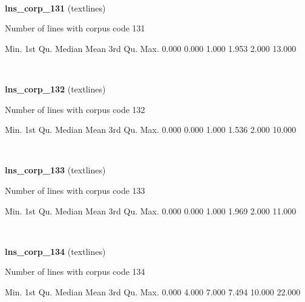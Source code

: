 \documentclass[]{article}
\newenvironment{Shaded}{\begin{snugshade}}{\end{snugshade}}
\newcommand{\FloatTok}[1]{\textcolor[rgb]{0.00,0.00,0.81}{{#1}}}
\newcommand{\NormalTok}[1]{{#1}}
\begin{document}
~

\vspace{1em}

\textbf{lns\_corp\_131} (textlines)

Number of lines with corpus code 131

\begin{Shaded}
\begin{Highlighting}[]
   \NormalTok{Min. 1st Qu.  Median    Mean 3rd Qu.    Max. }
  \FloatTok{0.000}   \FloatTok{0.000}   \FloatTok{1.000}   \FloatTok{1.953}   \FloatTok{2.000}  \FloatTok{13.000} 
\end{Highlighting}
\end{Shaded}

~

\vspace{1em}

\textbf{lns\_corp\_132} (textlines)

Number of lines with corpus code 132

\begin{Shaded}
\begin{Highlighting}[]
   \NormalTok{Min. 1st Qu.  Median    Mean 3rd Qu.    Max. }
  \FloatTok{0.000}   \FloatTok{0.000}   \FloatTok{1.000}   \FloatTok{1.536}   \FloatTok{2.000}  \FloatTok{10.000} 
\end{Highlighting}
\end{Shaded}

~

\vspace{1em}

\textbf{lns\_corp\_133} (textlines)

Number of lines with corpus code 133

\begin{Shaded}
\begin{Highlighting}[]
   \NormalTok{Min. 1st Qu.  Median    Mean 3rd Qu.    Max. }
  \FloatTok{0.000}   \FloatTok{0.000}   \FloatTok{1.000}   \FloatTok{1.969}   \FloatTok{2.000}  \FloatTok{11.000} 
\end{Highlighting}
\end{Shaded}

~

\vspace{1em}

\textbf{lns\_corp\_134} (textlines)

Number of lines with corpus code 134

\begin{Shaded}
\begin{Highlighting}[]
   \NormalTok{Min. 1st Qu.  Median    Mean 3rd Qu.    Max. }
  \FloatTok{0.000}   \FloatTok{4.000}   \FloatTok{7.000}   \FloatTok{7.494}  \FloatTok{10.000}  \FloatTok{22.000} 
\end{Highlighting}
\end{Shaded}
\end{document}

